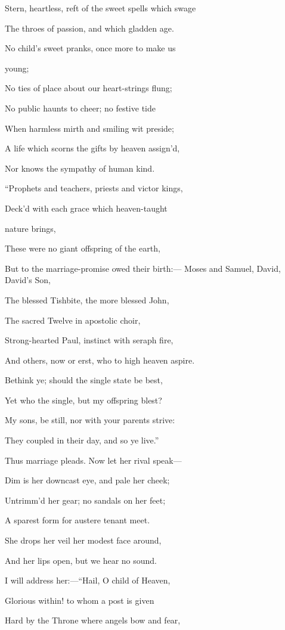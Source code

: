 Stern, heartless, reft of the sweet spells
which swage

The throes of passion, and which gladden age.

No child's sweet pranks, once more to make us

young;

No ties of place about our heart-strings
flung;

No public haunts to cheer; no festive tide

When harmless mirth and smiling wit preside;

A life which scorns the gifts by heaven
assign'd,

Nor knows the sympathy of human kind.

``Prophets and teachers, priests and
victor kings,

Deck'd with each grace which heaven-taught

nature brings,

These were no giant offspring of the earth,

But to the marriage-promise owed their birth:—
Moses and Samuel, David, David's Son,

The blessed Tishbite, the more blessed John,

The sacred Twelve in apostolic choir,

Strong-hearted Paul, instinct with seraph fire,

And others, now or erst, who to high heaven aspire.

Bethink ye; should the single state be best,

Yet who the single, but my offspring blest?

My sons, be still, nor with your parents strive:

They coupled in their day, and so ye live.''

Thus marriage pleads. Now let her rival speak—

Dim is her downcast eye, and pale her cheek;

Untrimm'd her gear; no sandals on her feet;

A sparest form for austere tenant meet.

She drops her veil her modest face around,

And her lips open, but we hear no sound.

I will address her:—``Hail, O child of Heaven,

Glorious within! to whom a post is given

Hard by the Throne where angels bow and fear,

